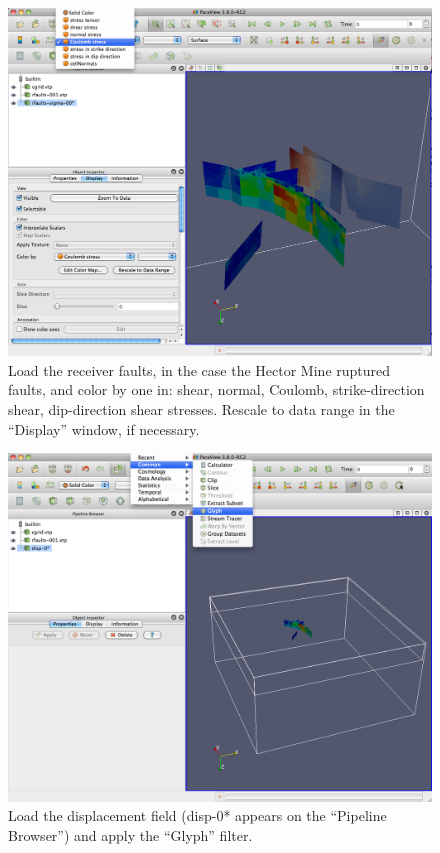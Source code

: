 \documentclass[10pt]{article}
\begin{document}
%
\begin{figure}
\begin{center}
\includegraphics[width=\textwidth]{paraview-coulomb.png}
\end{center}
\small
\caption{Load the receiver faults, in the case the Hector Mine ruptured faults, and color by one in: shear, normal, Coulomb, strike-direction shear, dip-direction shear stresses. Rescale to data range in the ``Display'' window, if necessary.}
\label{fig:coulomb}
\end{figure}
%


%
\begin{figure}
\begin{center}
\includegraphics[width=\textwidth]{paraview-disp-1.png}
\end{center}
\small
\caption{Load the displacement field (disp-0* appears on the ``Pipeline Browser'') and apply the ``Glyph'' filter.}
\label{fig:disp-1}
\end{figure}
%
\end{document}
